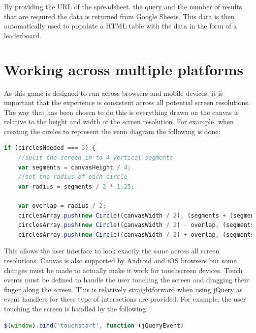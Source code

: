 \documentclass[12pt,a4paper]{report}
\begin{document}
By providing the URL of the spreadsheet, the query and the number of results that are required the data is returned from Google Sheets. This data is then automatically used to populate a HTML table with the data in the form of a leaderboard.

\section{Working across multiple platforms}
As this game is designed to run across browsers and mobile devices, it is important that the experience is consistent across all potential screen resolutions. The way that has been chosen to do this is everything drawn on the canvas is relative to the height and width of the screen resolution. 
For example, when creating the circles to represent the venn diagram the following is done:

\begin{minipage}{\linewidth}
\begin{lstlisting}[language=JavaScript]
if (circlesNeeded === 3) {
    //split the screen in to 4 vertical segments
    var segments = canvasHeight / 4;
    //set the radius of each circle
    var radius = segments / 2 * 1.25;

    var overlap = radius / 2;
    circlesArray.push(new Circle((canvasWidth / 2), (segments + (segments * 2)) / 2 + (segments / 6), radius));
    circlesArray.push(new Circle((canvasWidth / 2) - overlap, (segments * 2 + (segments * 3)) / 2 - (segments / 6), radius));
    circlesArray.push(new Circle((canvasWidth / 2) + overlap, (segments * 2 + (segments * 3)) / 2 - (segments / 6), radius));

\end{lstlisting}
\end{minipage}

This allows the user interface to look exactly the same across all screen resolutions. Canvas is also supported by Android and iOS browsers but some changes must be made to actually make it work for touchscreen devices. Touch events must be defined to handle the user touching the screen and dragging their finger along the screen. This is relatively straightforward when using jQuery as event handlers for these type of interactions are provided. For example, the user touching the screen is handled by the following:

\begin{minipage}{\linewidth}
\begin{lstlisting}[language=JavaScript]
$(window).bind('touchstart', function (jQueryEvent)
\end{lstlisting}
\end{minipage}
\end{document}
